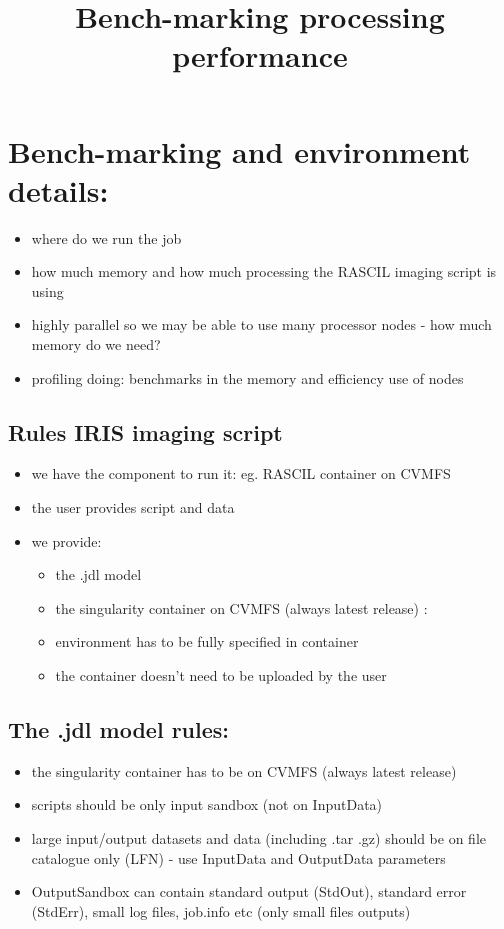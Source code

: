 \documentclass[english]{article}
\begin{document}
\title{ Bench-marking processing performance}

\maketitle  


\section{Bench-marking and environment details:}
\begin{itemize}
    \item where do we run the job
    \item how much memory and how much processing the RASCIL imaging script is using
    \item highly parallel so we may be able to use many processor nodes - how much memory do we
need?
    \item profiling doing: benchmarks in the memory and efficiency use of nodes
\end{itemize}

\subsection{Rules IRIS imaging script}
\begin{itemize}
    \item we have the component to run it: eg. RASCIL container on CVMFS
    \item the user provides script and data
    \item we provide: 
    \begin{itemize}
        \item the .jdl model
        \item the singularity container on CVMFS (always latest release) :
        \item environment has to be fully specified in container
        \item the container doesn't need to be uploaded by the user 
    \end{itemize}
\end{itemize}

\subsection{The .jdl model rules:}
\begin{itemize}
    \item the singularity container has to be on CVMFS (always latest release)
    \item scripts should be only input sandbox (not on InputData)
    \item large input/output datasets and data (including .tar .gz) should be on file catalogue only (LFN) - use InputData and OutputData parameters
    \item OutputSandbox can contain standard output (StdOut), standard error (StdErr), small log files, job.info etc (only small files outputs)
\end{itemize}
\end{document}
